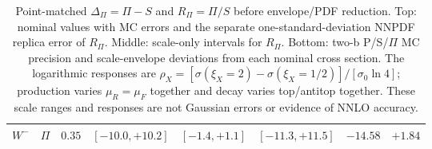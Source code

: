 \begin{table}[htbp]
\begin{tabular}{llrrrrrr}
$W^{-}$ & $\Pi$ & $0.35$ & $[-10.0,+10.2]$ & $[-1.4,+1.1]$ & $[-11.3,+11.5]$ & $-14.58$ & $+1.84$ \\
\bottomrule
\end{tabular}
\caption{Point-matched $\Delta_\Pi=\Pi-S$ and $R_\Pi=\Pi/S$ before envelope/PDF reduction. Top: nominal values with MC errors and the separate one-standard-deviation NNPDF replica error of $R_\Pi$. Middle: scale-only intervals for $R_\Pi$. Bottom: two-b P/S/$\Pi$ MC precision and scale-envelope deviations from each nominal cross section. The logarithmic responses are $\rho_X=[\sigma(\xi_X=2)-\sigma(\xi_X=1/2)]/[\sigma_0\ln4]$; production varies $\mu_R=\mu_F$ together and decay varies top/antitop together. These scale ranges and responses are not Gaussian errors or evidence of NNLO accuracy.}
\label{tab:mainresponses}
\end{table}
